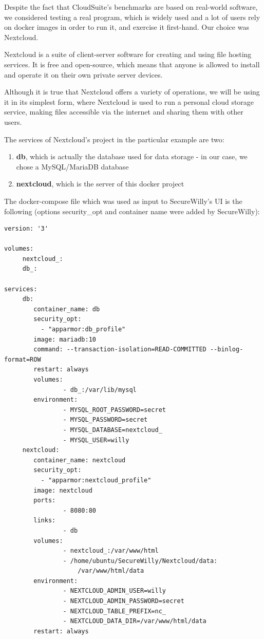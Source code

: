 Despite the fact that CloudSuite's benchmarks are based on real-world software, we considered testing a real program, which is widely used and a lot of users rely on docker images in order to run it, and exercise it first-hand. Our choice was Nextcloud.

Nextcloud is a suite of client-server software for creating and using file hosting services. It is free and open-source, which means that anyone is allowed to install and operate it on their own private server devices. \cite{wikinext}

Although it is true that Nextcloud offers a variety of operations, we will be using it in its simplest form, where Nextcloud is used to run a personal cloud storage service, making files accessible via the internet and sharing them with other users.

The services of Nextcloud's project in the particular example are two:
\begin{enumerate}
\item \textbf{db}, which is actually the database used for data storage - in our case, we chose a MySQL/MariaDB database
\item \textbf{nextcloud}, which is the server of this docker project
\end{enumerate}

The docker-compose file which was used as input to SecureWilly's UI is the following (options security\_opt and container name were added by SecureWilly):

\begin{lstlisting}[style=Dockerfile, caption={Nextcloud's docker-compose.yml}]
version: '3'

volumes:
     nextcloud_:
     db_:

services:
     db:
        container_name: db
        security_opt:
          - "apparmor:db_profile"
        image: mariadb:10
        command: --transaction-isolation=READ-COMMITTED --binlog-format=ROW
        restart: always
        volumes:
                - db_:/var/lib/mysql
        environment:
                - MYSQL_ROOT_PASSWORD=secret
                - MYSQL_PASSWORD=secret
                - MYSQL_DATABASE=nextcloud_
                - MYSQL_USER=willy
     nextcloud:
        container_name: nextcloud
        security_opt:
          - "apparmor:nextcloud_profile"
        image: nextcloud
        ports:
                - 8080:80
        links:
                - db
        volumes:
                - nextcloud_:/var/www/html
                - /home/ubuntu/SecureWilly/Nextcloud/data:
					/var/www/html/data
        environment:
                - NEXTCLOUD_ADMIN_USER=willy
                - NEXTCLOUD_ADMIN_PASSWORD=secret
                - NEXTCLOUD_TABLE_PREFIX=nc_
                - NEXTCLOUD_DATA_DIR=/var/www/html/data
        restart: always
\end{lstlisting}

